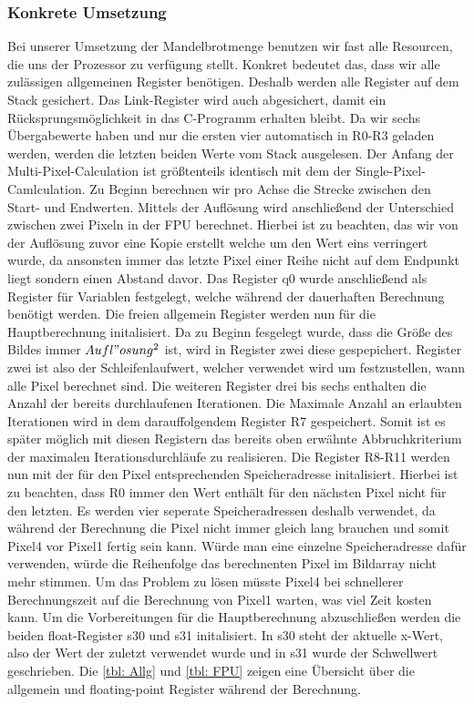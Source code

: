 \documentclass[11pt]{scrartcl}
\begin{document}
\subsubsection{Konkrete Umsetzung}
Bei unserer Umsetzung der Mandelbrotmenge  benutzen wir fast alle Resourcen, die uns der Prozessor zu verfügung stellt.
Konkret bedeutet das, dass wir alle zulässigen allgemeinen Register benötigen. Deshalb werden alle Register auf dem Stack gesichert. Das Link-Register wird auch abgesichert, damit ein Rücksprungsmöglichkeit in das C-Programm erhalten bleibt.
Da wir sechs Übergabewerte haben und nur die ersten vier automatisch in R0-R3 geladen werden, werden die letzten beiden Werte vom Stack ausgelesen.
Der Anfang der Multi-Pixel-Calculation ist größtenteils identisch mit dem der Single-Pixel-Camlculation.
Zu Beginn berechnen wir pro Achse die Strecke zwischen den Start- und Endwerten.
Mittels der Auflösung wird anschließend der Unterschied zwischen zwei Pixeln in der FPU berechnet.
Hierbei ist zu beachten, das wir von der Auflösung zuvor eine Kopie erstellt welche um den Wert eins verringert wurde, da ansonsten immer das letzte Pixel einer Reihe nicht auf dem Endpunkt liegt sondern einen Abstand davor.
Das Register q0 wurde anschließend als Register für Variablen festgelegt, welche während der dauerhaften Berechnung benötigt werden.
Die freien allgemein Register werden nun für die Hauptberechnung initalisiert.
Da zu Beginn fesgelegt wurde, dass die Größe des Bildes immer $Aufl"osung^2$ ist, wird in Register zwei diese gespepichert.
Register zwei ist also der Schleifenlaufwert, welcher verwendet wird um festzustellen, wann alle Pixel berechnet sind.
Die weiteren Register drei bis sechs enthalten die Anzahl der bereits durchlaufenen Iterationen.
Die Maximale Anzahl an erlaubten Iterationen wird in dem darauffolgendem Register R7 gespeichert.
Somit ist es später möglich mit diesen Registern das bereits oben erwähnte Abbruchkriterium der maximalen Iterationsdurchläufe zu realisieren.
Die Register R8-R11 werden nun mit der für den Pixel entsprechenden Speicheradresse initalisiert.
Hierbei ist zu beachten, dass R0 immer den Wert enthält für den nächsten Pixel nicht für den letzten.
Es werden vier seperate Speicheradressen deshalb verwendet, da während der Berechnung die Pixel nicht immer gleich lang brauchen und somit Pixel4 vor Pixel1 fertig sein kann.
Würde man eine einzelne Speicheradresse dafür verwenden, würde die Reihenfolge das berechnenten Pixel im Bildarray nicht mehr stimmen.
Um das Problem zu lösen müsste Pixel4 bei schnellerer Berechnungszeit auf die Berechnung von Pixel1 warten, was viel Zeit kosten kann.
Um die Vorbereitungen für die Hauptberechnung abzuschließen werden die beiden float-Register s30 und s31 initalisiert.
In s30 steht der aktuelle x-Wert, also der Wert der zuletzt verwendet wurde und in s31 wurde der Schwellwert geschrieben.
Die \autoref{tbl: Allg} und \autoref{tbl: FPU} zeigen eine Übersicht über die allgemein und floating-point Register während der Berechnung.
\end{document}
